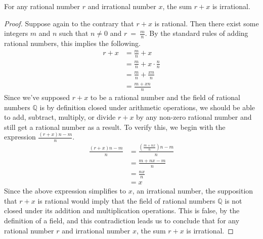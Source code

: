 \begin{proposition}
	\label{proposition-1.1.2}
	For any rational number $r$ and irrational number $x$, the sum $r + x$ is irrational.
\end{proposition}
\begin{proof}
	Suppose again to the contrary that $r + x$ is rational. Then there exist some integers $m$ and $n$ such that $n \neq 0$ and $r~=~\frac{m}{n}$. By the standard rules of adding rational numbers, this implies the following.
	\begin{align*}
	r + x &= \frac{m}{n} + x \\
	&= \frac{m}{n} + x \cdot \frac{n}{n} \\
	&= \frac{m}{n} + \frac{xn}{n} \\
	&= \frac{m+xn}{n}
	\end{align*}
	Since we've supposed $r + x$ to be a rational number and the field of rational numbers $\mathbb{Q}$ is by definition closed under arithmetic operations, we should be able to add, subtract, multiply, or divide $r + x$ by any non-zero rational number and still get a rational number as a result. To verify this, we begin with the expression $\frac{\left( r + x \right) n - m}{n}$.
	\begin{align*}
	\frac{ \left( r + x \right) n - m }{n} &= \frac{ \left( \frac{ m + nx }{n} \right) n - m }{n} \\
	&= \frac{m + nx - m}{n} \\
	&= \frac{nx}{n} \\
	&= x
	\end{align*}
	Since the above expression simplifies to $x$, an irrational number, the supposition that $r + x$ is rational would imply that the field of rational numbers $\mathbb{Q}$ is not closed under its addition and multiplication operations. This is false, by the definition of a field, and this contradiction leads us to conclude that for any rational number $r$ and irrational number $x$, the sum $r + x$ is irrational.
\end{proof}
